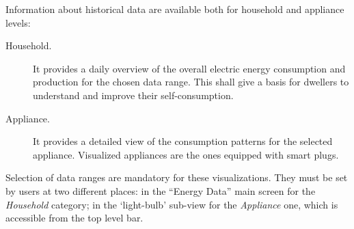 % 
Information about historical data are available both for household and appliance levels:
\begin{description}
 \item[Household.] It provides a daily overview of the overall electric energy consumption and production for the chosen data range. This shall give a basis for dwellers to understand and improve their self-consumption.
 \item[Appliance.] It provides a detailed view of the consumption patterns for the selected appliance. Visualized appliances are the ones equipped with smart plugs. 
\end{description}
Selection of data ranges are mandatory for these visualizations. They must be set by users at two different places: in the ``Energy Data'' main screen for the \textit{Household} category;
in the `light-bulb' sub-view for the \textit{Appliance} one, which is accessible from the top level bar.



